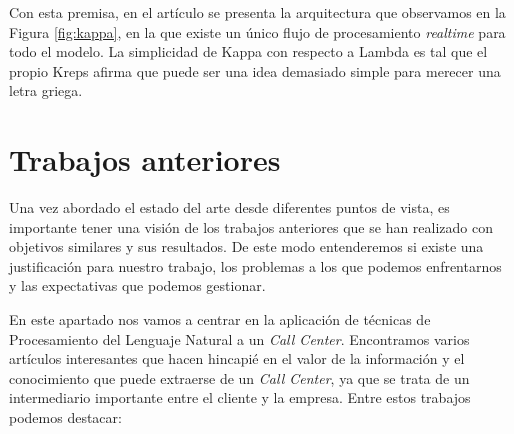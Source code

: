 Con esta premisa, en el artículo se presenta la arquitectura que observamos en la Figura \ref{fig:kappa}, en la que existe un único flujo de procesamiento \textit{realtime} para todo el modelo. La simplicidad de Kappa con respecto a Lambda es tal que el propio Kreps afirma que puede ser una idea demasiado simple para merecer una letra griega.



\section{Trabajos anteriores}
\label{section:arte:ant}


Una vez abordado el estado del arte desde diferentes puntos de vista, es importante tener una visión de los trabajos anteriores que se han realizado con objetivos similares y sus resultados. De este modo entenderemos si existe una justificación para nuestro trabajo, los problemas a los que podemos enfrentarnos y las expectativas que podemos gestionar.

En este apartado nos vamos a  centrar en la aplicación de técnicas de Procesamiento del Lenguaje Natural a un \textit{Call Center}. Encontramos varios artículos interesantes que hacen hincapié en el valor de la información y el conocimiento que puede extraerse de un \textit{Call Center}, ya que se trata de un intermediario importante entre el cliente y la empresa. Entre estos trabajos podemos destacar: 

